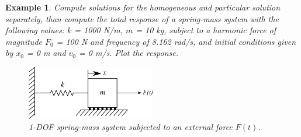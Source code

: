 \documentclass[12pt,letter]{article}
\newtheorem{ex}{Example}
\numberwithin{ex}{section} %
\newenvironment{example}{\begin{mdframed}[middlelinewidth=0.5mm]\begin{ex}\normalfont}{\end{ex}\end{mdframed}}
\numberwithin{re}{section} %
\numberwithin{vcs}{section} %
\begin{document}
\begin{example}

			Compute solutions for the homogeneous and particular solution separately, than compute the total response of a spring-mass system with the following values: $k$ = 1000 N/m, $m$ = 10 kg, subject to a harmonic force of magnitude $F_0$ = 100 N and frequency of 8.162 rad/s, and initial conditions given by $x_0$ = 0 m and $v_0$ = 0 m/s. Plot the response.
			
			\begin{figure}[H]
				\centering
				\includegraphics[width=0.5\textwidth]{../figures/1-DOF-spring_mass_horizontal_forced.png}
				\caption{1-DOF spring-mass system subjected to an external force $F(t)$.}
			\end{figure}
			

\end{example}
\end{document}
